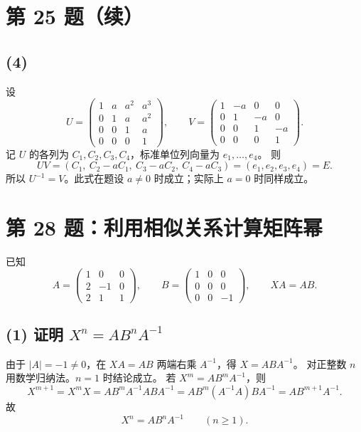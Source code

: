 \documentclass[11pt,a4paper,fontset=fandol]{ctexart}
\newcommand{\ans}[1]{\boxed{#1}}
\newcommand{\problem}[1]{\Needspace{9\baselineskip}\section*{#1}}
\begin{document}
\newpage
\section*{第 25 题（续）}
\subsection*{(4)}
设
\[
U=\begin{pmatrix}
1&a&a^2&a^3\\0&1&a&a^2\\0&0&1&a\\0&0&0&1
\end{pmatrix},\qquad
V=\begin{pmatrix}
1&-a&0&0\\0&1&-a&0\\0&0&1&-a\\0&0&0&1
\end{pmatrix}.
\]
记 $U$ 的各列为 $C_1,C_2,C_3,C_4$，标准单位列向量为 $e_1,\ldots,e_4$。
则
\[
UV=(C_1,\ C_2-aC_1,\ C_3-aC_2,\ C_4-aC_3)
=(e_1,e_2,e_3,e_4)=E.
\]
所以 $\ans{U^{-1}=V}$。此式在题设 $a\ne0$ 时成立；实际上 $a=0$ 时同样成立。

\problem{第 28 题：利用相似关系计算矩阵幂}
已知
\[
A=\begin{pmatrix}1&0&0\\2&-1&0\\2&1&1\end{pmatrix},\qquad
B=\begin{pmatrix}1&0&0\\0&0&0\\0&0&-1\end{pmatrix},
\qquad XA=AB.
\]
\subsection*{(1) 证明 $X^n=AB^nA^{-1}$}
由于 $|A|=-1\ne0$，在 $XA=AB$ 两端右乘 $A^{-1}$，得 $X=ABA^{-1}$。
对正整数 $n$ 用数学归纳法。$n=1$ 时结论成立。
若 $X^m=AB^mA^{-1}$，则
\[
X^{m+1}=X^mX
=AB^mA^{-1}ABA^{-1}
=AB^m(A^{-1}A)BA^{-1}
=AB^{m+1}A^{-1}.
\]
故
\[
\ans{X^n=AB^nA^{-1}\qquad(n\ge1)}.
\]

\end{document}
